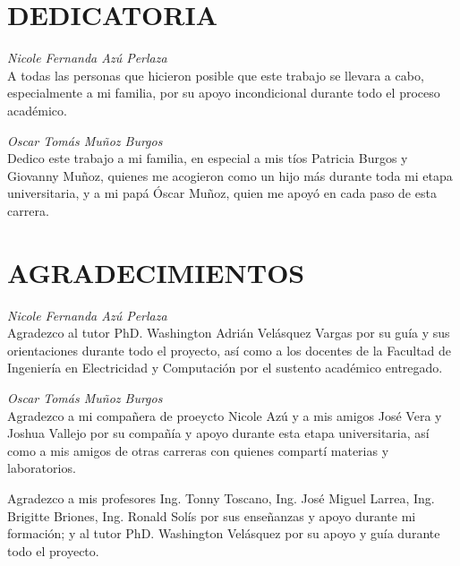\chapter*{DEDICATORIA}
\thispagestyle{empty}
\begin{flushright}
    \begin{minipage}{.45\linewidth}
        \textit{Nicole Fernanda Az\'u Perlaza}\\
        A todas las personas que hicieron posible que este trabajo se llevara a cabo, 
        especialmente a mi familia, por su apoyo incondicional durante todo el proceso acad\'emico.

        \par\vspace{3.0em}

        \textit{Oscar Tom\'as Mu\~noz Burgos}\\
        Dedico este trabajo a mi familia, en especial a mis t\'ios Patricia Burgos y Giovanny Mu\~noz,
        quienes me acogieron como un hijo m\'as durante toda mi etapa universitaria, y a mi pap\'a
        \'Oscar Mu\~noz, quien me apoy\'o en cada paso de esta carrera.
    \end{minipage}
\end{flushright}


\chapter*{AGRADECIMIENTOS}
\thispagestyle{empty}
\begin{flushright}
    \begin{minipage}{.45\linewidth}
        \textit{Nicole Fernanda Az\'u Perlaza}\\
        Agradezco al tutor PhD. Washington Adri\'an Vel\'asquez Vargas por su gu\'ia y sus orientaciones
        durante todo el proyecto, as\'i como a los docentes de la Facultad de Ingenier\'ia en
        Electricidad y Computaci\'on por el sustento acad\'emico entregado.

    \vspace{3.0em}

        \textit{Oscar Tom\'as Mu\~noz Burgos}\\
        Agradezco a mi compañera de proeycto Nicole Az\'u y a mis amigos Jos\'e Vera y Joshua Vallejo por su compa\~n\'ia y apoyo
        durante esta etapa universitaria, as\'i como a mis amigos de otras carreras con quienes compart\'i
        materias y laboratorios.

        Agradezco a mis profesores Ing. Tonny Toscano, Ing. Jos\'e Miguel Larrea, Ing. Brigitte Briones,
        Ing. Ronald Sol\'is por sus ense\~nanzas y apoyo durante mi formaci\'on; y al tutor PhD. Washington Vel\'asquez por su apoyo y gu\'ia durante todo el proyecto.
    \end{minipage}
\end{flushright}


